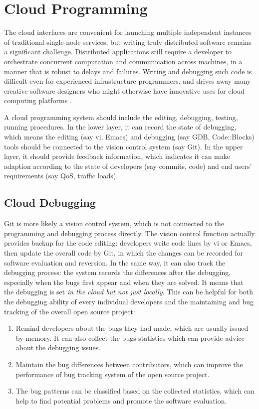 \documentclass[draftclsnofoot,journal,onecolumn,12pt]{IEEEtran}
\begin{document}
\section{Cloud Programming}

The cloud interfaces are convenient for launching multiple independent instances of traditional single-node services, but writing truly distributed software remains a significant challenge. Distributed applications still require a developer to orchestrate concurrent computation and communication across machines, in a manner that is robust to delays and failures. Writing and debugging such code is difficult even for experienced infrastructure programmers, and drives away many creative software designers who might otherwise have innovative uses for cloud computing platforms \cite{Alvaro:2010:BAE:1755913.1755937}.

A cloud programming system should include the editing, debugging, testing, running procedures. In the lower layer, it can record the state of debugging, which means the editing (say vi, Emacs) and debugging (say GDB, Code::Blocks) tools should be connected to the vision control system (say Git). In the upper layer, it should provide feedback information, which indicates it can make adaption according to the state of developers (say commits, code) and end users' requirements (say QoS, traffic loads).

\subsection{Cloud Debugging}
Git is more likely a vision control system, which is not connected to the programming and debugging process directly. The vision control function actually provides backup for the code editing: developers write code lines by vi or Emacs, then update the overall code by Git, in which the changes can be recorded for software evaluation and reversion. In the same way, it can also track the debugging process: the system records the differences after the debugging, especially when the bugs first appear and when they are solved. It means that the debugging is set \textit{in the cloud but not just locally}. This can be helpful for both the debugging ability of every individual developers and the maintaining and bug tracking of the overall open source project:

\begin{enumerate}
  \item Remind developers about the bugs they had made, which are usually issued by memory. It can also collect the bugs statistics which can provide advice about the debugging issues.
  \item Maintain the bug differences between contributors, which can improve the performance of bug tracking system of the open source project.
  \item The bug patterns can be classified based on the collected statistics, which can help to find potential problems and promote the software evaluation.
\end{enumerate}
\end{document}
